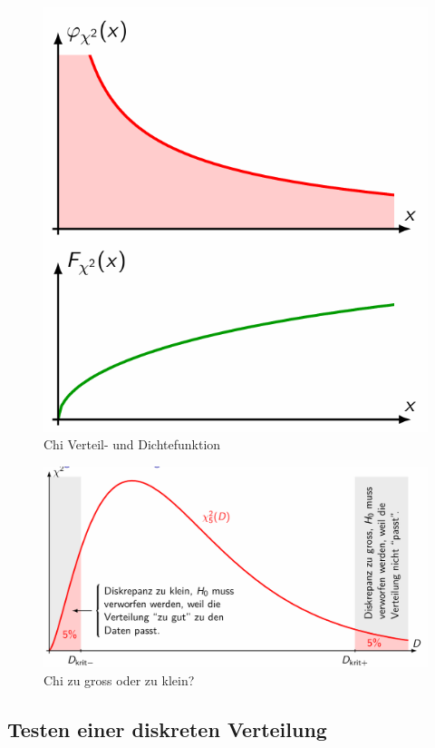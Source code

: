\documentclass[../Main.tex]{subfiles}
\begin{document}
\begin{figure}[H]
    \centering
    \includegraphics[width=1\linewidth]{Images/chi-verteilung.png}
    \caption{Chi Verteil- und Dichtefunktion}
\end{figure}

\begin{figure}[H]
    \centering
    \includegraphics[width=1\linewidth]{Images/chi-gross-klein.png}
    \caption{Chi zu gross oder zu klein?}
\end{figure}

\subsection{Testen einer diskreten Verteilung}
\end{document}
